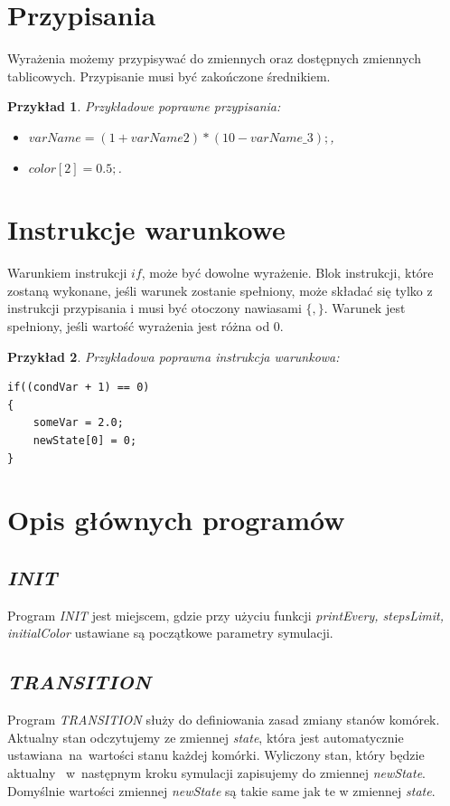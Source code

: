 \documentclass[declaration,shortabstract, inz]{iithesis}
\theoremstyle{definition} \newtheorem{definition}{Definicja}[]
\theoremstyle{plain} \newtheorem{remark}[definition]{Obserwacja}
\theoremstyle{plain} \newtheorem{theorem}[definition]{Twierdzenie}
\theoremstyle{plain} \newtheorem{example}{Przykład}[definition]
\theoremstyle{plain} \newtheorem{lemma}[definition]{Lemat}
\begin{document}
\section{Przypisania}
Wyrażenia możemy przypisywać do zmiennych oraz dostępnych zmiennych tablicowych. Przypisanie musi być zakończone średnikiem.

\begin{example}
Przykładowe poprawne przypisania:
\begin{itemize}
\item $varName = (1 + varName2) * (10 - varName\_3);$,
\item $color[2] = 0.5;$.
\end{itemize}
\end{example}

\section{Instrukcje warunkowe}
Warunkiem instrukcji $if$, może być dowolne wyrażenie. Blok instrukcji, które zostaną wykonane, jeśli warunek zostanie spełniony, może składać się tylko z instrukcji przypisania i musi być otoczony nawiasami $\{, \}$. Warunek jest spełniony, jeśli wartość wyrażenia jest różna od $0$.

\begin{example}
Przykładowa poprawna instrukcja warunkowa:
\begin{center}
\begin{lstlisting}
if((condVar + 1) == 0)
{
	someVar = 2.0;
	newState[0] = 0;
}
\end{lstlisting}
\end{center}
\end{example}

\section{Opis głównych programów}

\subsection{\textit{INIT}}
Program \textit{INIT} jest miejscem, gdzie przy użyciu funkcji \textit{printEvery, stepsLimit, initialColor} ustawiane są początkowe parametry symulacji.

\subsection{\textit{TRANSITION}}
Program \textit{TRANSITION} służy do definiowania zasad zmiany stanów komórek. Aktualny stan odczytujemy ze zmiennej \textit{state}, która jest automatycznie ustawiana~na~wartości stanu każdej komórki. Wyliczony stan, który będzie aktualny ~w~następnym kroku symulacji zapisujemy do zmiennej \textit{newState}. Domyślnie wartości zmiennej \textit{newState} są takie same jak te w zmiennej \textit{state}.
\end{document}
